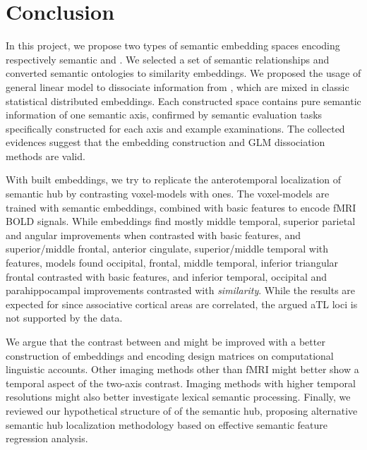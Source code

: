 \chapter{Conclusion} %

\label{chap:conclusion} 

In this project, we propose two types of semantic embedding spaces encoding respectively semantic \similarity and \association. We selected a set of \similarity semantic relationships and converted semantic ontologies to similarity embeddings. We proposed the usage of general linear model to dissociate \similarity information from \association, which are mixed in classic statistical distributed embeddings. Each constructed space contains pure semantic information of one semantic axis, confirmed by semantic evaluation tasks specifically constructed for each axis and example examinations. The collected evidences suggest that the \similarity embedding construction and GLM dissociation methods are valid.

With built embeddings, we try to replicate the anterotemporal localization of semantic hub by contrasting \similarity voxel-models with \association ones. The voxel-models are trained with semantic embeddings, combined with basic features to encode fMRI BOLD signals. While \similarity embeddings find mostly middle temporal, superior parietal and angular improvements when contrasted with basic features, and superior/middle frontal, anterior cingulate, superior/middle temporal with \association features, \association models found occipital, frontal, middle temporal, inferior triangular frontal contrasted with basic features, and inferior temporal, occipital and parahippocampal improvements contrasted with \emph{similarity}. While the results are expected for \association since associative cortical areas are correlated, the argued aTL loci is not supported by the data.

We argue that the contrast between \similarity and \association might be improved with a better construction of \similarity embeddings and encoding design matrices on computational linguistic accounts. Other imaging methods other than fMRI might better show a temporal aspect of the two-axis contrast. Imaging methods with higher temporal resolutions might also better investigate lexical semantic processing. Finally, we reviewed our hypothetical structure of \similarity of the semantic hub, proposing alternative semantic hub localization methodology based on effective semantic feature regression analysis.